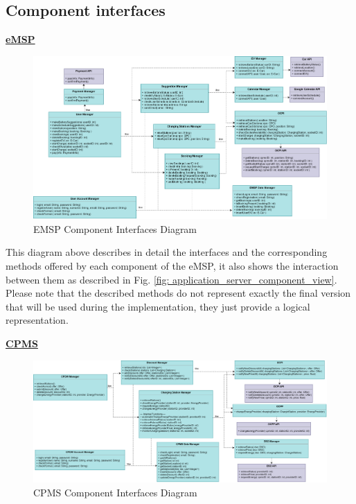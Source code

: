 \documentclass[table, 12pt]{article}
\begin{document}
\subsection{Component interfaces}
\underline{\textbf{eMSP}}\\
\begin{center}
    \begin{figure}[H]
        \includegraphics[scale=0.59, center]{assets/interfacesDiagrams/EMSP interface diagram.png}
        \caption{EMSP Component Interfaces Diagram}
        \label{fig: EMSP component_interfaces}
    \end{figure}
\end{center}

This diagram above describes in detail the interfaces and the corresponding methods offered by each component of the eMSP, it also shows the interaction between them as described in Fig. \ref*{fig: application_server_component_view}.\\
Please note that the described methods do not represent exactly the final version that will be used during the implementation, they just provide a logical representation.
\newpage

\underline{\textbf{CPMS}}\\
\begin{center}
    \begin{figure}[H]
        \includegraphics[scale=0.55, center]{assets/interfacesDiagrams/CPMS interface diagram.png}
        \caption{CPMS Component Interfaces Diagram}
        \label{fig: CPMS component_interfaces}
    \end{figure}
\end{center}
\end{document}
